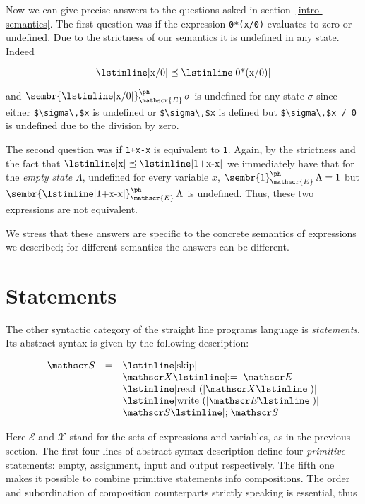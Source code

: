 Now we can give precise answers to the questions asked in section~\ref{intro-semantics}.
The first question was if the expression \lstinline|0*(x/0)| evaluates to zero or undefined. Due to the strictness of our semantics it is undefined in
any state. Indeed

\[
\mbox{\lstinline|x/0|}\preceq \mbox{\lstinline|0*(x/0)|}
\]

and $\sembr{\mbox{\lstinline|x/0|}}^\ph_\mathscr{E}\,\sigma$ is
undefined for any state $\sigma$ since either \lstinline[mathescape=true]|$\sigma\,$x| is undefined or
\lstinline[mathescape=true]|$\sigma\,$x| is defined but \lstinline[mathescape=true]|$\sigma\,$x / 0| is
undefined due to the division by zero.

The second question was if \lstinline|1+x-x| is equivalent to \lstinline|1|. Again, by the strictness and the
fact that $\mbox{\lstinline|x|}\preceq\mbox{\lstinline|1+x-x|}$ we immediately have that for the \emph{empty state}
$\Lambda$, undefined for every variable $x$, $\sembr{1}^\ph_\mathscr{E}\,\Lambda=1$ but $\sembr{\mbox{\lstinline|1+x-x|}}^\ph_\mathscr{E}\,\Lambda$ is undefined.
Thus, these two expressions are not equivalent.

We stress that these answers are specific to the concrete semantics of expressions we described; for different semantics the answers can be different.

\section{Statements}

The other syntactic category of the straight line programs language is \emph{statements}. Its abstract syntax is given by the following
description:

\[
\renewcommand{\arraystretch}{1}
\begin{array}{rcl}
  \mathscr S & = & \mbox{\lstinline|skip|} \\
             &   & \mathscr X \mbox{\lstinline|:=|} \;\mathscr E \\
             &   & \mbox{\lstinline|read (|} \mathscr X \mbox{\lstinline|)|} \\
             &   & \mbox{\lstinline|write (|} \mathscr E \mbox{\lstinline|)|} \\
             &   & \mathscr S \mbox{\lstinline|;|} \mathscr S
\end{array}
\]

Here $\mathscr E$ and $\mathscr X$ stand for the sets of expressions and variables, as in the previous section. The first four lines of abstract
syntax description define four \emph{primitive} statements: empty, assignment, input and output respectively. The fifth one makes it possible to
combine primitive statements info compositions. The order and subordination of composition counterparts strictly speaking is essential, thus

